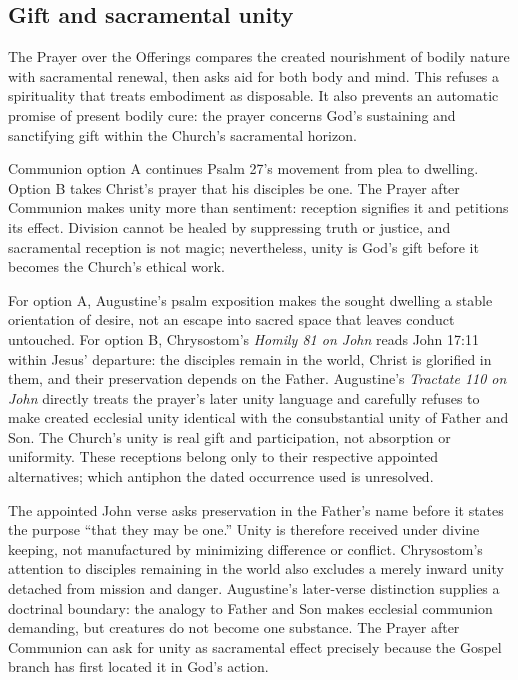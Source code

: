 \subsection*{Gift and sacramental unity\enspace{}}

The Prayer over the Offerings compares the created nourishment of bodily nature with sacramental renewal, then asks aid for both body and mind. This refuses a spirituality that treats embodiment as disposable. It also prevents an automatic promise of present bodily cure: the prayer concerns God's sustaining and sanctifying gift within the Church's sacramental horizon.

Communion option A continues Psalm 27's movement from plea to dwelling. Option B takes Christ's prayer that his disciples be one. The Prayer after Communion makes unity more than sentiment: reception signifies it and petitions its effect. Division cannot be healed by suppressing truth or justice, and sacramental reception is not magic; nevertheless, unity is God's gift before it becomes the Church's ethical work.

For option A, Augustine's psalm exposition makes the sought dwelling a stable orientation of desire, not an escape into sacred space that leaves conduct untouched. For option B, Chrysostom's \emph{Homily 81 on John} reads John 17:11 within Jesus' departure: the disciples remain in the world, Christ is glorified in them, and their preservation depends on the Father. Augustine's \emph{Tractate 110 on John} directly treats the prayer's later unity language and carefully refuses to make created ecclesial unity identical with the consubstantial unity of Father and Son. The Church's unity is real gift and participation, not absorption or uniformity. These receptions belong only to their respective appointed alternatives; which antiphon the dated occurrence used is unresolved.

The appointed John verse asks preservation in the Father's name before it states the purpose “that they may be one.” Unity is therefore received under divine keeping, not manufactured by minimizing difference or conflict. Chrysostom's attention to disciples remaining in the world also excludes a merely inward unity detached from mission and danger. Augustine's later-verse distinction supplies a doctrinal boundary: the analogy to Father and Son makes ecclesial communion demanding, but creatures do not become one substance. The Prayer after Communion can ask for unity as sacramental effect precisely because the Gospel branch has first located it in God's action.

